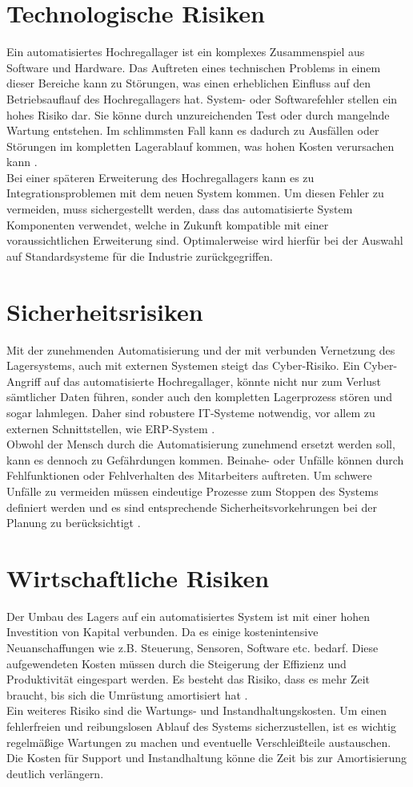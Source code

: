 \section{Technologische Risiken}
Ein automatisiertes Hochregallager ist ein komplexes Zusammenspiel aus Software und Hardware. Das Auftreten eines technischen Problems in einem dieser Bereiche kann zu Störungen, was einen erheblichen Einfluss  auf den  Betriebsauflauf des Hochregallagers hat.
%
System- oder Softwarefehler stellen ein hohes Risiko dar. Sie könne durch unzureichenden Test oder durch mangelnde Wartung entstehen. Im schlimmsten Fall kann es dadurch zu Ausfällen oder Störungen im kompletten Lagerablauf kommen, was hohen Kosten verursachen kann \autocite{hartel_projektmanagement_2019}.\\
Bei einer späteren Erweiterung des Hochregallagers kann es zu Integrationsproblemen mit dem neuen System kommen. Um diesen Fehler zu vermeiden, muss sichergestellt werden, dass das automatisierte System Komponenten verwendet, welche in Zukunft kompatible mit einer voraussichtlichen Erweiterung sind. Optimalerweise wird hierfür bei der Auswahl auf Standardsysteme für die Industrie zurückgegriffen.
\section{Sicherheitsrisiken}
Mit der zunehmenden Automatisierung und der mit verbunden Vernetzung des Lagersystems, auch mit externen Systemen steigt das Cyber-Risiko. Ein Cyber-Angriff auf das automatisierte Hochregallager, könnte nicht nur zum Verlust sämtlicher Daten führen, sonder auch den kompletten Lagerprozess stören und sogar lahmlegen. Daher sind robustere IT-Systeme notwendig, vor allem zu externen Schnittstellen, wie ERP-System \autocite{haumer_it-sicherheit_2015}.\\
%
Obwohl der Mensch durch die Automatisierung zunehmend ersetzt werden soll, kann es dennoch zu Gefährdungen kommen. Beinahe- oder Unfälle können durch Fehlfunktionen oder Fehlverhalten des Mitarbeiters auftreten. Um schwere Unfälle zu vermeiden müssen eindeutige Prozesse zum Stoppen des Systems definiert werden und es sind entsprechende Sicherheitsvorkehrungen bei der Planung zu berücksichtigt \autocite{fahl2016}.
\section{Wirtschaftliche Risiken}
Der Umbau des Lagers auf ein automatisiertes System ist mit einer hohen Investition von Kapital verbunden. Da es einige kostenintensive Neuanschaffungen wie z.B. Steuerung, Sensoren, Software etc. bedarf. Diese aufgewendeten Kosten müssen durch die Steigerung der Effizienz und Produktivität eingespart werden. Es besteht das Risiko, dass es mehr Zeit braucht, bis sich die Umrüstung amortisiert hat \autocite{schmitz1994}.\\
%
Ein weiteres Risiko sind die Wartungs- und Instandhaltungskosten. Um einen fehlerfreien und reibungslosen Ablauf des Systems sicherzustellen, ist es wichtig regelmäßige Wartungen zu machen und eventuelle Verschleißteile austauschen. Die Kosten für Support und Instandhaltung könne die Zeit bis zur Amortisierung deutlich verlängern. 